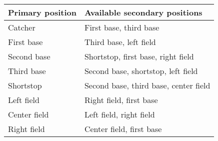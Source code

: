 \begin{deepEnumerate}
	\begin{center}
		\begin{tabular}{|l|l|}
			\hline
			Primary position & Available secondary positions         \\
			\hline
			Catcher          & First base, third base                \\
			\hline
			First base       & Third base, left field                \\
			\hline
			Second base      & Shortstop, first base, right field    \\
			\hline
			Third base       & Second base, shortstop, left field    \\
			\hline
			Shortstop        & Second base, third base, center field \\
			\hline
			Left field       & Right field, first base               \\
			\hline
			Center field     & Left field, right field               \\
			\hline
			Right field      & Center field, first base              \\
			\hline 
		\end{tabular}
	\end{center}
\end{deepEnumerate}

